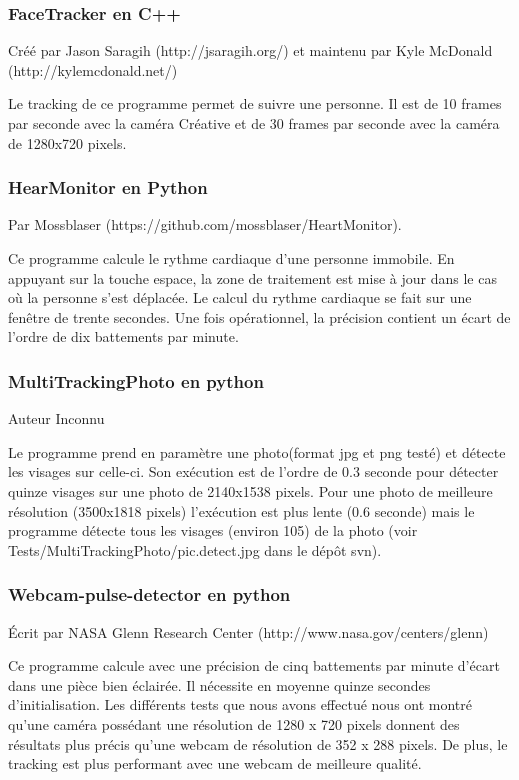 \documentclass[12pt,a4paper]{article}
\begin{document}
\subsubsection{FaceTracker en C++ }
Créé par Jason Saragih (http://jsaragih.org/) et maintenu par Kyle McDonald (http://kylemcdonald.net/)

Le tracking de ce programme permet de suivre une personne. Il est de 10 frames par seconde avec la caméra Créative et de 30 frames par seconde avec la caméra de 1280x720 pixels.
\newline

\subsubsection{HearMonitor en Python}
Par Mossblaser (https://github.com/mossblaser/HeartMonitor).

Ce programme calcule le rythme cardiaque d'une personne immobile. En appuyant sur la touche espace, la zone de traitement est mise à jour dans le cas où la personne s'est déplacée. Le calcul du rythme cardiaque se fait sur une fenêtre de trente secondes. 
Une fois opérationnel, la précision contient un écart de l'ordre de dix battements par minute.

\subsubsection{MultiTrackingPhoto en python}
Auteur Inconnu 

Le programme prend en paramètre une photo(format jpg et png testé) et détecte les visages sur celle-ci.
Son exécution est de l'ordre de 0.3 seconde pour détecter quinze visages sur une photo de 2140x1538 pixels.
Pour une photo de meilleure résolution (3500x1818 pixels) l'exécution est plus lente (0.6 seconde) mais le programme détecte tous les visages (environ 105) de la photo (voir Tests/MultiTrackingPhoto/pic.detect.jpg dans le dépôt svn).

\subsubsection{Webcam-pulse-detector en python}
Écrit par NASA Glenn Research Center (http://www.nasa.gov/centers/glenn)

Ce programme calcule avec une précision de cinq battements par minute d'écart dans une pièce bien éclairée. Il nécessite en moyenne quinze secondes d'initialisation.
Les différents tests que nous avons effectué nous ont montré qu'une caméra possédant une résolution de 1280 x 720 pixels donnent des résultats plus précis qu'une webcam de résolution de 352 x 288 pixels. 
De plus, le tracking est plus performant avec une webcam de meilleure qualité.
\end{document}

